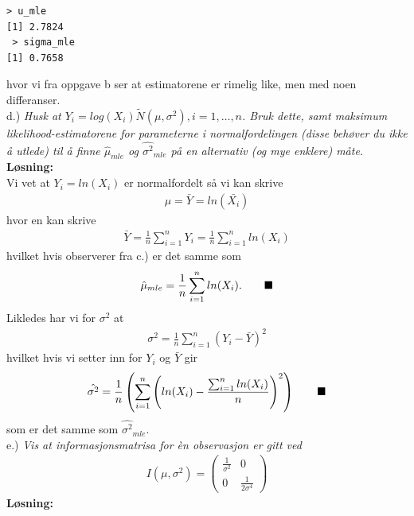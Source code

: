 \documentclass[12pt,
               a4paper,
               article,
               oneside,
               oldfontcommands,
               norsk]{memoir}
\newcommand{\Q}{ \qquad \hfill \blacksquare}
\begin{document}
\begin{verbatim}
> u_mle
[1] 2.7824
 > sigma_mle
[1] 0.7658
\end{verbatim}
hvor vi fra oppgave b ser at estimatorene er rimelig like, men med noen differanser. \vspace{5mm}\\
d.) \emph{Husk at $Y_i = log(X_i) \tilde N(\mu, \sigma^2), i = 1,\ldots,n$. Bruk dette, samt maksimum likelihood-estimatorene for parameterne i normalfordelingen (disse behøver
du ikke å utlede) til  å finne $\hat{\mu}_{mle}$ og $\hat{\sigma^2}_{mle}$ på en alternativ (og mye enklere) måte.
}\vspace{3mm}\\
\textbf{Løsning:}\vspace{3mm}\\
Vi vet at $Y_i = ln(X_i)$ er normalfordelt så vi kan skrive
\begin{align*}
    \mu = \bar{Y} = ln(\bar{X_i})
\end{align*}
hvor en kan skrive
\begin{align*}
    \bar{Y} = \frac{1}{n} \sum_{i=1}^{n} Y_i =  \frac{1}{n} \sum_{i=1}^{n} ln(X_i)
\end{align*}
hvilket hvis observerer fra c.) er det samme som 
\begin{align*}
    \hat{\mu}_{mle} = \frac{1}{n} \sum_{i=1}^{n} ln(X_i). \Q
\end{align*}
Likledes har vi for $\sigma^2$ at
\begin{align*}
    \sigma^2 = \frac{1}{n} \sum_{i=1}^{n} (Y_i - \bar{Y})^2
\end{align*}
hvilket hvis vi setter inn for $Y_i$ og $\bar{Y}$ gir 
\begin{align*}
\hat{\sigma^2} = \frac{1}{n} \left(\sum_{i = 1}^{n}\left(ln(X_i)- \frac{\sum_{i=1}^{n}ln(X_i)}{n}\right)^2\right) \Q
\end{align*}
som er det samme som $\hat{\sigma^2}_{mle}$.\vspace{5mm}\\
e.) \emph{Vis at informasjonsmatrisa for èn observasjon er gitt ved} 
\begin{align*}
    I(\mu, \sigma^2) = 
\begin{pmatrix}
    \frac{1}{\sigma^2} & 0\\[3pt]
    0 & \frac{1}{2 \sigma^4}
\end{pmatrix}
\end{align*}
\textbf{Løsning:}\vspace{3mm}\\
\end{document}
